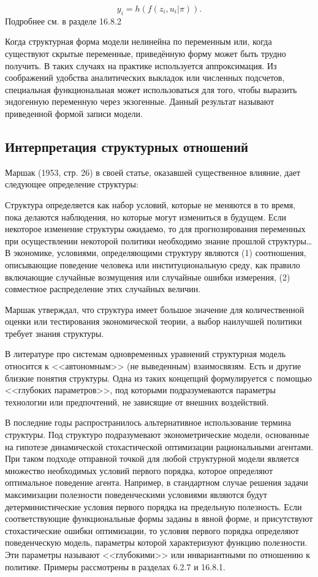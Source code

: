 \begin{equation}
y_{i}=h(f(z_{i},u_{i}|\pi)).
\end{equation}
Подробнее см. в разделе 16.8.2


Когда структурная форма модели  нелинейна по  переменным или, когда существуют скрытые переменные, приведённую форму может быть  трудно получить. В таких случаях на практике используется аппроксимация. Из соображений удобства аналитических выкладок или численных подсчетов, специальная функциональная может использоваться для того, чтобы выразить эндогенную переменную через  экзогенные. Данный результат называют приведенной формой записи модели.  



\subsection{Интерпретация структурных отношений}


Маршак (1953, стр. 26) в своей статье, оказавшей существенное влияние, дает следующее определение структуры: 


Структура определяется как набор условий, которые не меняются в то время, пока делаются наблюдения, но которые могут измениться в будущем. Если некоторое изменение структуры ожидаемо, то для прогнозирования переменных при осуществлении некоторой политики необходимо  знание прошлой структуры\ldots 
В экономике, условиями, определяющими структуру являются (1) соотношения, описывающие поведение человека или институциональную среду, как правило включающие случайные возмущения или случайные ошибки измерения, (2) совместное распределение этих случайных величин. 


Маршак утверждал, что структура имеет большое значение для количественной оценки или тестирования экономической теории, а выбор наилучшей политики требует знания структуры. 


В литературе про системам одновременных уравнений  структурная модель относится к <<автономным>> (не выведенным) взаимосвязям. Есть и другие близкие понятия структуры. Одна из таких концепций формулируется с помощью <<глубоких параметров>>, под которыми подразумеваются параметры технологии или предпочтений, не зависящие от внешних воздействий. 


В последние годы распространилось альтернативное использование термина структуры. Под структуро подразумевают эконометрические модели, основанные на гипотезе динамической стохастической оптимизации рациональными агентами. При таком подходе отправной точкой для любой структурной модели  является множество необходимых условий первого порядка, которое определяют оптимальное поведение агента. 
Например, в стандартном случае  решения задачи максимизации полезности поведенческими условиями являются будут детерминистические условия первого порядка на предельную полезность. Если соответствующие функциональные формы заданы в явной форме, и присутствуют стохастические ошибки оптимизации, то условия первого порядка определяют поведенческую модель, параметры которой характеризуют функцию полезности. Эти параметры называют  <<глубокими>> или инвариантными по отношению к политике. Примеры рассмотрены в разделах 6.2.7 и 16.8.1. 


